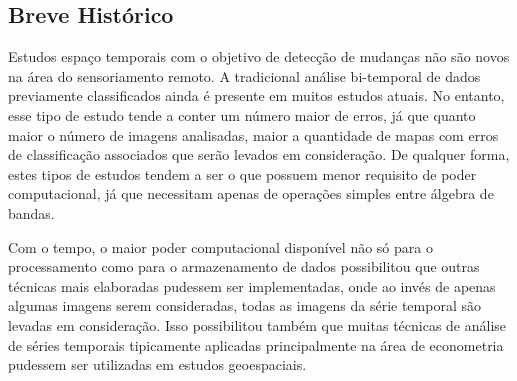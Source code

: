 \documentclass[12pt,a4paper]{article}
\begin{document}
\subsection{Breve Histórico}

\hspace{13pt} Estudos espaço temporais com o objetivo de detecção de mudanças não são novos na área do sensoriamento remoto. A tradicional análise bi-temporal de dados previamente classificados ainda é presente em muitos estudos atuais. No entanto, esse tipo de estudo tende a conter um número maior de erros, já que quanto maior o número de imagens analisadas, maior a quantidade de mapas com erros de classificação associados que serão levados em consideração. De qualquer forma, estes tipos de estudos tendem a ser o que possuem menor requisito de poder computacional, já que necessitam apenas de operações simples entre álgebra de bandas.

Com o tempo, o maior poder computacional disponível não só para o processamento como para o armazenamento de dados possibilitou que outras técnicas mais elaboradas pudessem ser implementadas, onde ao invés de apenas algumas imagens serem consideradas, todas as imagens da série temporal são levadas em consideração. Isso possibilitou também que muitas técnicas de análise de séries temporais tipicamente aplicadas principalmente na área de econometria pudessem ser utilizadas em estudos geoespaciais.
\end{document}
